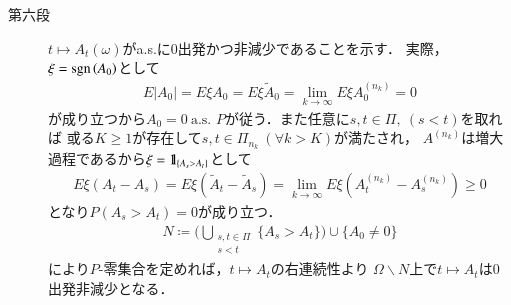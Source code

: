 \begin{prf}[未修正]
\begin{description}
			\item[第六段]
				$t \longmapsto A_t(\omega)$がa.s.に0出発かつ非減少であることを示す．
				実際，$\xi = \operatorname{sgn}\left( A_0 \right)$として
				\begin{align}
					E |A_0| = E \xi A_0 = E \xi \tilde{A}_0 = \lim_{k \to \infty} E \xi A^{(n_k)}_0 = 0
				\end{align}
				が成り立つから$A_0 = 0\ \mbox{a.s. $P$}$が従う．また任意に$s,t \in \Pi,\ (s<t)$を取れば
				或る$K \geq 1$が存在して$s,t \in \Pi_{n_k}\ (\forall k > K)$が満たされ，
				$A^{(n_k)}$は増大過程であるから$\xi = \mbox{1}\hspace{-0.25em}\mbox{l}_{\{A_s > A_t\}}$として
				\begin{align}
					E \xi (A_t - A_s) = E \xi \left( \tilde{A}_t - \tilde{A}_s \right)
					= \lim_{k \to \infty} E \xi \left( A^{(n_k)}_t - A^{(n_k)}_s \right) \geq 0 
				\end{align}
				となり$P(A_s > A_t) = 0$が成り立つ．
				\begin{align}
					N \coloneqq \Biggl(\bigcup_{\substack{s,t \in \Pi \\ s < t}} \{A_s > A_t\}\Biggr) \cup \{A_0 \neq 0\}
				\end{align}
				により$P$-零集合を定めれば，$t \longmapsto A_t$の右連続性より
				$\Omega \backslash N$上で$t \longmapsto A_t$は0出発非減少となる．
				

\end{description}
\end{prf}
